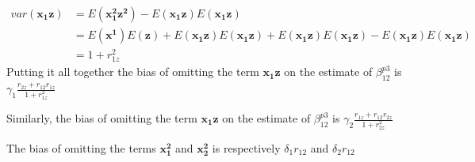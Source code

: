 \documentclass[12pt]{article}
\begin{document}
\begin{align*}
	var(\mathbf{x_1 z}) &= E(\mathbf{x_1^2 z^2}) - E(\mathbf{x_1 z}) E(\mathbf{x_1 z}) \\
	&= E(\mathbf{x^1}) E(\mathbf{z}) +  E(\mathbf{x_1 z}) E(\mathbf{x_1 z}) + E(\mathbf{x_1 z}) E(\mathbf{x_1 z}) - E(\mathbf{x_1 z}) E(\mathbf{x_1 z}) \\
	&= 1 + r^2_{1z}
\end{align*}
Putting it all together the bias of omitting the term $\mathbf{x_1 z}$ on the estimate of $\beta^{p3}_{12}$ is  $\gamma_1 \frac{r_{2z} + r_{12} r_{1z}}{1 + r^2_{1z}}$

Similarly, the bias of omitting the term $\mathbf{x_1 z}$ on the estimate of $\beta^{p3}_{12}$ is  $\gamma_2 \frac{r_{1z} + r_{12} r_{2z}}{1 + r_{2z}^2}$

The bias of omitting the terms $\mathbf{x_1^2}$ and $\mathbf{x_2^2}$ is respectively $\delta_1 r_{12}$ and $\delta_2 r_{12}$
\end{document}

